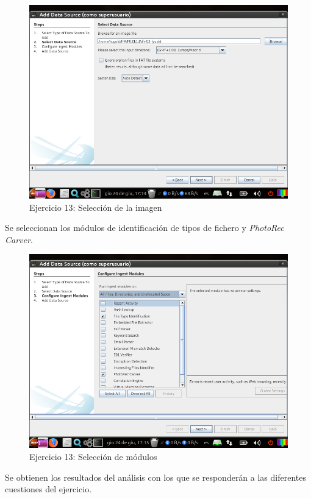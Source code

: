 \documentclass[11pt]{article}
\begin{document}
\begin{figure}[H]
    \caption{Ejercicio 13: Selección de la imagen}
    \centering
    \includegraphics[scale=0.7]{p03/e13-3.png}
\end{figure}

Se seleccionan los módulos de identificación de tipos de fichero y \textit{PhotoRec Carver}.

\begin{figure}[H]
    \caption{Ejercicio 13: Selección de módulos}
    \centering
    \includegraphics[scale=0.7]{p03/e13-4.png}
\end{figure}

Se obtienen los resultados del análisis con los que se responderán a las diferentes cuestiones del ejercicio.
\end{document}
